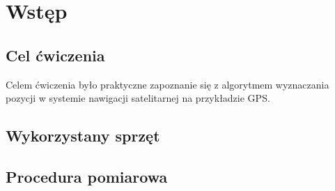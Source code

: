 \newpage
\section{Wstęp}

\subsection{Cel ćwiczenia}
Celem ćwiczenia było praktyczne zapoznanie się z algorytmem wyznaczania pozycji w systemie nawigacji satelitarnej na przykładzie GPS.

\subsection{Wykorzystany sprzęt}

\subsection{Procedura pomiarowa}